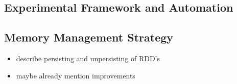 \subsection{Experimental Framework and Automation}

\subsection{Memory Management Strategy}
\begin{itemize}
    \item describe persisting and unpersisting of RDD's
    \item maybe already mention improvements
\end{itemize}
